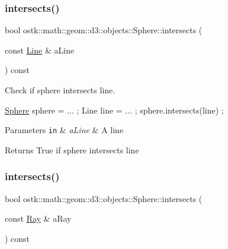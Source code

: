 \subsubsection{\texorpdfstring{intersects()}{intersects()}\hspace{0.1cm}{\footnotesize\ttfamily [3/9]}}
{\footnotesize\ttfamily bool ostk\+::math\+::geom\+::d3\+::objects\+::\+Sphere\+::intersects (\begin{DoxyParamCaption}\item[{const \hyperlink{classostk_1_1math_1_1geom_1_1d3_1_1objects_1_1_line}{Line} \&}]{a\+Line }\end{DoxyParamCaption}) const}



Check if sphere intersects line. 


\begin{DoxyCode}
\hyperlink{classostk_1_1math_1_1geom_1_1d3_1_1objects_1_1_sphere_a6920f72260a7b2c9ffc29283540e16c2}{Sphere} sphere = ... ;
Line line = ... ;
sphere.intersects(line) ;
\end{DoxyCode}



\begin{DoxyParams}[1]{Parameters}
\mbox{\tt in}  & {\em a\+Line} & A line \\
\hline
\end{DoxyParams}
\begin{DoxyReturn}{Returns}
True if sphere intersects line 
\end{DoxyReturn}
\mbox{\label{classostk_1_1math_1_1geom_1_1d3_1_1objects_1_1_sphere_aff56934077d5851cc168dae45613d78d}} 
\subsubsection{\texorpdfstring{intersects()}{intersects()}\hspace{0.1cm}{\footnotesize\ttfamily [4/9]}}
{\footnotesize\ttfamily bool ostk\+::math\+::geom\+::d3\+::objects\+::\+Sphere\+::intersects (\begin{DoxyParamCaption}\item[{const \hyperlink{classostk_1_1math_1_1geom_1_1d3_1_1objects_1_1_ray}{Ray} \&}]{a\+Ray }\end{DoxyParamCaption}) const}



